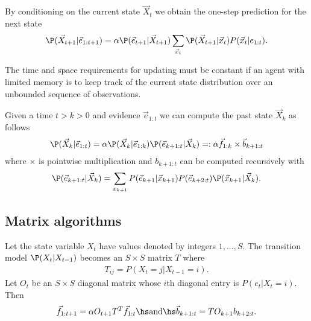 \documentclass{article}
\begin{document}
\begin{theorem}
    By conditioning on the current state $\vec X_t$ we obtain the one-step prediction for the
    next state
    \begin{align*}
        \P(\vec X_{t+1}|\vec e_{1:t+1}) = \alpha \P(\vec e_{t+1}|\vec X_{t+1})\sum_{\vec x_t} \P(\vec X_{t+1}|\vec x_t)P(\vec x_t|e_{1:t}).
    \end{align*}
\end{theorem}

\begin{theorem}
    The time and space requirements for updating must be constant if
    an agent with limited memory is to keep track of the current state
    distribution over an unbounded sequence of observations.
\end{theorem}

\begin{theorem}
    Given a time $t>k>0$ and evidence $\vec e_{1:t}$ we can compute the
    past state $\vec X_k$ as follows
    \begin{align*}
        \P(\vec X_k|\vec e_{1:t}) = \alpha\P(\vec X_k|\vec e_{1:k})
        \P(\vec e_{k+1:t} | \vec X_k) =: \alpha\vec f_{1:k}\times\vec b_{k+1:t}
    \end{align*}
    where $\times$ is pointwise multiplication and $b_{k+1:t}$ can be 
    computed recursively with
    \begin{align*}
        \P(\vec e_{k+1:t}|\vec X_k) = \sum_{x_{k+1}}
        P(\vec e_{k+1}|\vec x_{k+1})P(\vec e_{k+2:t})\P(\vec x_{k+1}|\vec X_k).
    \end{align*}
\end{theorem}

\subsection{Matrix algorithms}

\begin{theorem}
    Let the state variable $X_t$ have values denoted by
    integers $1,...,S$. The transition model $\P(X_t|X_{t-1})$
    becomes an $S\times S$ matrix $T$ where
    \begin{align*}
        T_{ij} = P(X_t=j|X_{t-1}=i).
    \end{align*}
    Let $O_t$ be an $S\times S$ diagonal matrix whose $i$th
    diagonal entry is $P(e_t|X_t=i)$. Then
    \begin{align*}
        \vec f_{1:t+1} = \alpha O_{t+1}T^T \vec f_{1:t}
        \hs\text{and}\hs
        \vec b_{k+1:t} = TO_{k+1}b_{k+2:t}.
    \end{align*}
\end{theorem}
\end{document}

